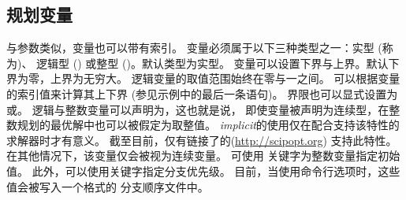 \subsection{规划变量}
与参数类似，变量也可以带有索引。
变量必须属于以下三种类型之一：实型 (称为)、
逻辑型 () 或整型 ()。默认类型为实型。
变量可以设置下界与上界。默认下界为零，上界为无穷大。
逻辑变量的取值范围始终在零与一之间。
可以根据变量的索引值来计算其上下界 (参见示例中的最后一条语句)。  
界限也可以显式设置为或。  
逻辑与整数变量可以声明为，这也就是说，
即使变量被声明为连续型，在整数规划的最优解中也可以被假定为取整值。
\emph{implicit}的使用仅在配合支持该特性的求解器时才有意义。  
截至目前，仅有链接了\zimpl 的\scip (\url{http://scipopt.org}) 支持此特性。  
在其他情况下，该变量仅会被视为连续变量。
可使用 关键字为整数变量指定初始值。  
此外，可以使用关键字指定分支优先级。  
目前，当使用命令行选项时，这些值会被写入一个\cplex 格式的
分支顺序文件中。

